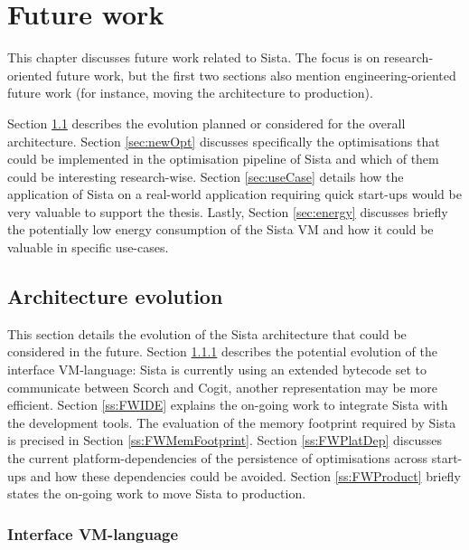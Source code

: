 \documentclass[a4paper,12pt,twoside]{../includes/ThesisStyle}
\begin{document}
\fi

\chapter{Future work}
\label{chap:futureWork}
\minitoc

This chapter discusses future work related to Sista. The focus is on research-oriented future work, but the first two sections also mention engineering-oriented future work (for instance, moving the architecture to production).

Section \ref{sec:archEvo} describes the evolution planned or considered for the overall architecture. Section \ref{sec:newOpt} discusses specifically the optimisations that could be implemented in the optimisation pipeline of Sista and which of them could be interesting research-wise. Section \ref{sec:useCase} details how the application of Sista on a real-world application requiring quick start-ups would be very valuable to support the thesis. Lastly, Section \ref{sec:energy} discusses briefly the potentially low energy consumption of the Sista VM and how it could be valuable in specific use-cases.

\section{Architecture evolution}
\label{sec:archEvo}

This section details the evolution of the Sista architecture that could be considered in the future. Section \ref{ss:FWInterface} describes the potential evolution of the interface VM-language: Sista is currently using an extended bytecode set to communicate between Scorch and Cogit, another representation may be more efficient. Section \ref{ss:FWIDE} explains the on-going work to integrate Sista with the development tools. The evaluation of the memory footprint required by Sista is precised in Section \ref{ss:FWMemFootprint}. Section \ref{ss:FWPlatDep} discusses the current platform-dependencies of the persistence of optimisations across start-ups and how these dependencies could be avoided. Section \ref{ss:FWProduct} briefly states the on-going work to move Sista to production.

\subsection{Interface VM-language}
\label{ss:FWInterface}
\end{document}
